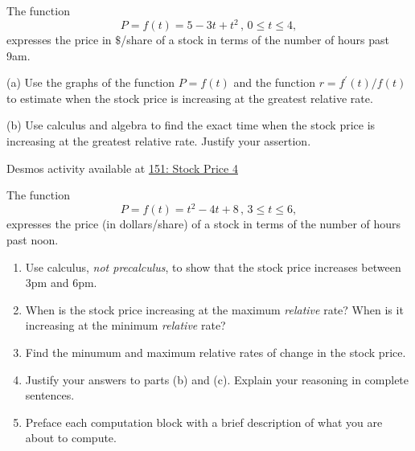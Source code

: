 \documentclass{ximera}
\begin{document}
\begin{question}  \label{Q:dfgtdftrtnhy}
The function 
\[
      P = f(t) = 5 -3t + t^2 \, , \, 0\leq t \leq 4 , 
\]
expresses the price in $\$$/share of a stock in terms of the number of hours past 9am.

(a) Use the graphs of the function $P=f(t)$ and the function $r=f^\prime(t)/f(t)$  to estimate when the stock price is increasing at the greatest relative rate.

(b) Use calculus and algebra to find the exact time when the stock price is increasing at the greatest relative rate. Justify your assertion.



\begin{onlineOnly}
    \begin{center}
\end{center}
\end{onlineOnly}

Desmos activity available at \href{https://www.desmos.com/calculator/y78fnyy7s3}{151: Stock Price 4}

\end{question}



\begin{question} \label{Q09ere33434}
The function
\[
   P = f(t) = t^2 - 4t + 8 \, , \, 3\leq t \leq 6 ,
\]
expresses the price (in dollars/share) of a stock in terms of the number of hours past noon.

\begin{enumerate}
\item Use calculus, \emph{not precalculus}, to show that the stock price increases between 3pm and 6pm.

\item When is the stock price increasing at the maximum \emph{relative} rate? When is it increasing at the minimum \emph{relative} rate?

\item Find the minumum and maximum relative rates of change in the stock price. 

\item Justify your answers to parts (b) and (c). Explain your reasoning in complete sentences. 

\item Preface each computation block with a brief description of what you are about to compute.


\end{enumerate}

\end{question}
\end{document}
